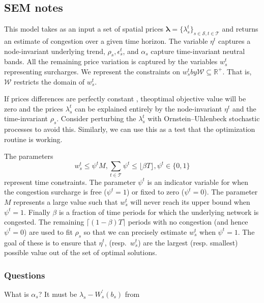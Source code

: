 \documentclass[11pt, letterpaper,nounbold]{article}
\renewcommand{\S}{\mathcal{S}}
\newcommand{\T}{\mathcal{T}}
\begin{document}
\subsection{SEM notes}
This model takes as an input a set of spatial prices $\pmb{\lambda} = \{\lambda_{s}^{t}\}_{s\in \S, t\in \T}$ and returns an estimate of congestion over a given time horizon. The variable $\eta^{t}$ captures a node-invariant underlying trend, $\rho_{s}, \epsilon_{s}^{t}$, and $\alpha_{s}$ capture time-invariant neutral bands. All the remaining price variation is captured by the variables $w_{s}^{t}$ representing surcharges. We represent the constraints on $w_{s}^{t} by \mathcal{W}\subseteq \mathbb{R}^{+}$. That is, $\mathcal{W}$ restricts the domain of $w_{s}^{t}$.

If prices differences are perfectly constant , theoptimal objective value will be zero and the prices $\lambda_{s}^{t}$ can be explained entirely by the node-invariant $\eta^{t}$ and the time-invariant $\rho_{s}$. Consider perturbing the $\lambda_{s}^{t}$ with Ornstein--Uhlenbeck stochastic processes to avoid this. Similarly, we can use this as a test that the optimization routine is working.

The parameters
	\[w_{s}^{t} \leq \psi^{t} M, \sum_{t\in \T} \psi^{t} \leq \lfloor \beta T\rfloor, \psi^{t} \in \{0,1\}\]
represent time constraints. The parameter $\psi^{t}$ is an indicator variable for when the congestion surcharge is free ($\psi^{t} =1$) or fixed to zero ($\psi^{t} = 0$). The parameter $M$ represents a large value such that $w_{s}^{t}$ will never reach its upper bound when $\psi^{t} = 1$. Finally $\beta$ is a fraction of time periods for which the underlying network is congested. The remaining $\lceil (1-\beta) T\rceil$ periods with no congestion (and hence $\psi^{t} = 0$) are used to fit $\rho_{s}$  so that we can precisely estimate $w_{s}^{t}$ when $\psi^{t} = 1$. The goal of these is to ensure that $\eta^{t}$, (resp.~$w_{s}^{t}$) are the largest (resp. smallest) possible value out of the set of optimal solutions.
\subsubsection*{Questions}
What is $\alpha_{s}$? It must be $\lambda_{s}-W^{\prime}_{s}(b_{s})$ from \cite[p.~7]{Zhu2020}


\end{document}
